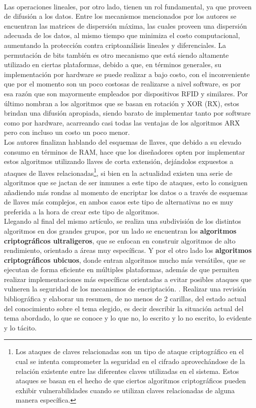 \documentclass[]{article}
\begin{document}
\\ Las operaciones lineales, por otro lado, tienen un rol fundamental, ya que proveen de difusión a los datos. Entre los mecanismos mencionados por los autores se encuentran las matrices de dispersión máxima, las cuales proveen una dispersión adecuada de los datos, al mismo tiempo que minimiza el costo computacional, aumentando la protección contra criptoanálisis lineales y diferenciales. La permutación de bits también es otro mecanismo que está siendo altamente utilizado en ciertas plataformas, debido a que, en términos generales, su implementación por hardware se puede realizar a bajo costo, con el inconveniente que por el momento son un poco costosas de realizarse a nivel software, es por esa razón que son mayormente empleados por dispositivos RFID y similares. Por último nombran a los algoritmos que se basan en rotación y XOR (RX), estos brindan una difusión apropiada, siendo barato de implementar tanto por software como por hardware, acarreando casi todas las ventajas de los algoritmos ARX pero con incluso un costo un poco menor.
\\ Los autores finalizan hablando del esquemas de llaves, que debido a su elevado consumo en términos de RAM, hace que los diseñadores opten por implementar estos algoritmos utilizando llaves de corta extensión, dejándolos expuestos a ataques de llaves relacionadas\footnote{Los ataques de claves relacionadas son un tipo de ataque criptográfico en el cual se intenta comprometer la seguridad en el cifrado aprovechándose de la relación existente entre las diferentes claves utilizadas en el sistema. Estos ataques se basan en el hecho de que ciertos algoritmos criptográficos pueden exhibir vulnerabilidades cuando se utilizan claves relacionadas de alguna manera específica.}, si bien en la actualidad existen una serie de algoritmos que se jactan de ser inmunes a este tipo de ataques, esto lo consiguen añadiendo más rondas al momento de encriptar los datos o a través de esquemas de llaves más complejos, en ambos casos este tipo de alternativas no es muy preferida a la hora de crear este tipo de algoritmos.
\\Llegando al final del mismo artículo, se realiza una subdivisión de los distintos algoritmos en dos grandes grupos, por un lado se encuentran los \textbf{algoritmos criptográficos ultraligeros}, que se enfocan en construir algoritmos de alto rendimiento, orientado a áreas muy específicas. Y por el otro lado los \textbf{algoritmos criptográficos ubicuos}, donde entran algoritmos mucho más versátiles, que se ejecutan de forma eficiente en múltiples plataformas, además de que permiten realizar implementaciones más específicas orientadas a evitar posibles ataques que vulneren la seguridad de los mecanismos de encriptación.
\newline {}. Realizar una revisión bibliográfica y elaborar un resumen, de no menos de 2 carillas, del estado actual del conocimiento sobre el tema elegido, es decir describir la situación actual del tema abordado, lo que se conoce y lo que no, lo escrito y lo no escrito, lo evidente y lo tácito.
\nocite{*}
\printbibliography[heading=bibintoc]
\end{document}
